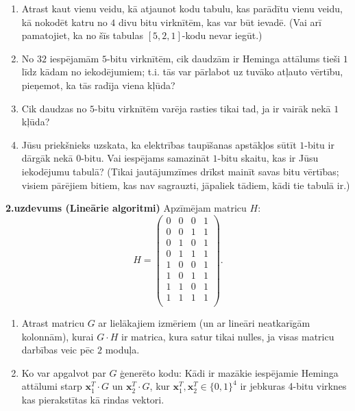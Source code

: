\documentclass[a4paper,12pt]{article}
\begin{document}
\begin{enumerate}[label=(\alph*)]
\item Atrast kaut vienu veidu, kā atjaunot kodu tabulu,
kas parādītu vienu veidu, kā nokodēt katru no $4$ divu bitu virknītēm, 
kas var būt ievadē. (Vai arī pamatojiet, ka no šīs tabulas 
$[5,2,1]$-kodu nevar iegūt.)
\item No $32$ iespējamām $5$-bitu virknītēm, cik dau\-dzām 
ir Heminga attālums tieši $1$
līdz kādam no iekodējumiem; t.i. tās var pārlabot uz tuvāko atļauto vērtību,
pieņemot, ka tās radīja viena kļūda?
\item Cik daudzas no $5$-bitu virknītēm 
varēja ras\-ties tikai tad, ja ir vairāk nekā $1$ kļūda?
\item Jūsu priekšnieks uzskata, ka elektrības tau\-pī\-ša\-nas apstākļos
sūtīt $1$-bitu ir dārgāk nekā $0$-bitu.
Vai iespējams samazināt $1$-bitu skai\-tu, kas ir Jūsu iekodējumu tabulā?
(Tikai jau\-tā\-jum\-zī\-mes drīkst mainīt 
savas bitu vēr\-tī\-bas; visiem pārējiem bitiem,
kas nav sagrauzti, jāpaliek tādiem, kādi tie tabulā ir.)
\end{enumerate}

\vspace{20pt}
{\bf 2.uzdevums (Lineārie algoritmi) }
Apzīmējam matricu $H$:
{\footnotesize
$$H = \left( \begin{array}{cccc}
0 & 0 & 0 & 1 \\
0 & 0 & 1 & 1 \\
0 & 1 & 0 & 1 \\
0 & 1 & 1 & 1 \\
1 & 0 & 0 & 1 \\
1 & 0 & 1 & 1 \\
1 & 1 & 0 & 1 \\
1 & 1 & 1 & 1 \\
\end{array} \right).$$
}

\begin{enumerate}[label=(\alph*)]
\item
Atrast matricu $G$ ar lielākajiem izmēriem (un ar lineāri neatkarīgām kolonnām), kurai 
$G \cdot H$ ir matrica, kura satur tikai nulles, ja visas matricu darbības veic pēc $2$ moduļa. 
\item Ko var apgalvot par $G$ ģenerēto kodu: Kādi ir mazākie iespējamie Heminga attālumi 
starp $\mathbf{x}_1^T \cdot G$ un $\mathbf{x}_2^T \cdot G$, kur
$\mathbf{x}_1^T, \mathbf{x}_2^T \in \{ 0,1 \}^4$ ir jebkuras 4-bitu virknes
kas pierakstītas kā rindas vektori.
\end{enumerate}
\end{document}
